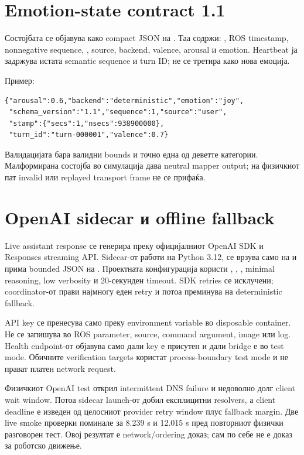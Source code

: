 \section{Emotion-state contract 1.1}

Состојбата се објавува како compact JSON на . Таа
содржи: , ROS timestamp, nonnegative sequence,
, source, backend, valence, arousal и emotion. Heartbeat ја
задржува истата semantic sequence и turn ID; не се третира како нова емоција.

Пример:

\begin{lstlisting}[language={},caption={Скратен пример на emotion-state 1.1},label={lst:state-contract}]
{"arousal":0.6,"backend":"deterministic","emotion":"joy",
 "schema_version":"1.1","sequence":1,"source":"user",
 "stamp":{"secs":1,"nsecs":938900000},
 "turn_id":"turn-000001","valence":0.7}
\end{lstlisting}

Валидацијата бара валидни bounds и точно една од деветте категории. Малформирана
состојба во симулација дава neutral mapper output; на физичкиот пат invalid или
replayed transport frame не се прифаќа.

\section{OpenAI sidecar и offline fallback}

Live assistant response се генерира преку официјалниот OpenAI SDK и Responses
streaming API. Sidecar-от работи на Python 3.12,
се врзува само на  и прима bounded JSON на
. Проектната конфигурација користи ,
, , minimal reasoning, low verbosity и
20-секунден timeout. SDK retries се исклучени; coordinator-от прави најмногу
еден retry и потоа преминува на deterministic fallback.

API key се пренесува само преку environment variable во disposable container.
Не се запишува во ROS parameter, source, command argument, image или log.
Health endpoint-от објавува само дали key е присутен и дали bridge е во test
mode. Обичните verification targets користат process-boundary test mode и не
прават платен network request.

Физичкиот OpenAI test открил intermittent DNS failure и недоволно долг client
wait window. Потоа sidecar launch-от добил експлицитни resolvers, а client
deadline е изведен од целосниот provider retry window плус fallback margin.
Две live smoke проверки поминале за 8.239 s и 12.015 s пред повторниот физички
разговорен тест. Овој резултат е network/ordering доказ; сам по себе не е доказ
за роботско движење.
